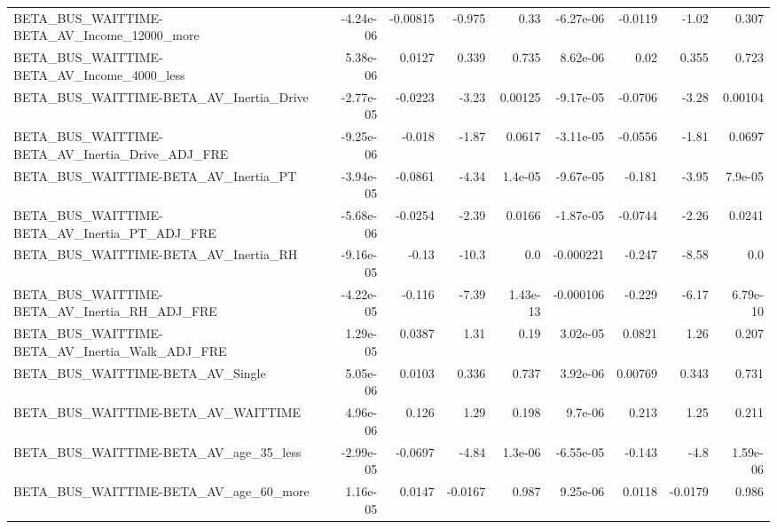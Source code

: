 \begin{tabular}{lrrrrrrrr}
BETA\_BUS\_WAITTIME-BETA\_AV\_Income\_12000\_more        &   -4.24e-06 &     -0.00815 &   -0.975 &     0.33 &  -6.27e-06 &     -0.0119 &        -1.02 &         0.307 \\
BETA\_BUS\_WAITTIME-BETA\_AV\_Income\_4000\_less         &    5.38e-06 &       0.0127 &    0.339 &    0.735 &   8.62e-06 &        0.02 &        0.355 &         0.723 \\
BETA\_BUS\_WAITTIME-BETA\_AV\_Inertia\_Drive            &   -2.77e-05 &      -0.0223 &    -3.23 &  0.00125 &  -9.17e-05 &     -0.0706 &        -3.28 &       0.00104 \\
BETA\_BUS\_WAITTIME-BETA\_AV\_Inertia\_Drive\_ADJ\_FRE    &   -9.25e-06 &       -0.018 &    -1.87 &   0.0617 &  -3.11e-05 &     -0.0556 &        -1.81 &        0.0697 \\
BETA\_BUS\_WAITTIME-BETA\_AV\_Inertia\_PT               &   -3.94e-05 &      -0.0861 &    -4.34 &  1.4e-05 &  -9.67e-05 &      -0.181 &        -3.95 &       7.9e-05 \\
BETA\_BUS\_WAITTIME-BETA\_AV\_Inertia\_PT\_ADJ\_FRE       &   -5.68e-06 &      -0.0254 &    -2.39 &   0.0166 &  -1.87e-05 &     -0.0744 &        -2.26 &        0.0241 \\
BETA\_BUS\_WAITTIME-BETA\_AV\_Inertia\_RH               &   -9.16e-05 &        -0.13 &    -10.3 &      0.0 &  -0.000221 &      -0.247 &        -8.58 &           0.0 \\
BETA\_BUS\_WAITTIME-BETA\_AV\_Inertia\_RH\_ADJ\_FRE       &   -4.22e-05 &       -0.116 &    -7.39 & 1.43e-13 &  -0.000106 &      -0.229 &        -6.17 &      6.79e-10 \\
BETA\_BUS\_WAITTIME-BETA\_AV\_Inertia\_Walk\_ADJ\_FRE     &    1.29e-05 &       0.0387 &     1.31 &     0.19 &   3.02e-05 &      0.0821 &         1.26 &         0.207 \\
BETA\_BUS\_WAITTIME-BETA\_AV\_Single                   &    5.05e-06 &       0.0103 &    0.336 &    0.737 &   3.92e-06 &     0.00769 &        0.343 &         0.731 \\
BETA\_BUS\_WAITTIME-BETA\_AV\_WAITTIME                 &    4.96e-06 &        0.126 &     1.29 &    0.198 &    9.7e-06 &       0.213 &         1.25 &         0.211 \\
BETA\_BUS\_WAITTIME-BETA\_AV\_age\_35\_less              &   -2.99e-05 &      -0.0697 &    -4.84 &  1.3e-06 &  -6.55e-05 &      -0.143 &         -4.8 &      1.59e-06 \\
BETA\_BUS\_WAITTIME-BETA\_AV\_age\_60\_more              &    1.16e-05 &       0.0147 &  -0.0167 &    0.987 &   9.25e-06 &      0.0118 &      -0.0179 &         0.986 \\

\end{tabular}
